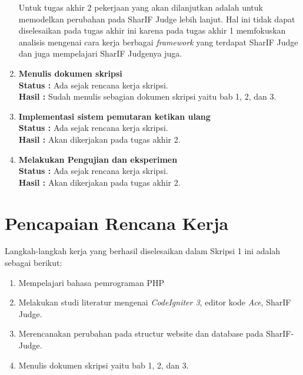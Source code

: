 \documentclass[a4paper,twoside]{article}
\begin{document}
\begin{enumerate}
	      \vspace{0.15cm}
	      Untuk tugas akhir 2 pekerjaan yang akan dilanjutkan adalah untuk memodelkan perubahan pada SharIF Judge lebih lanjut. Hal ini tidak dapat diselesaikan pada tugas akhir ini karena pada tugas akhir 1 memfokuskan analisis mengenai cara kerja berbagai \textit{framework} yang terdapat SharIF Judge dan juga mempelajari SharIF Judgenya juga.

	      \vspace{0.5cm}
	\item \textbf{Menulis dokumen skripsi}\\
	      {\bf Status :} Ada sejak rencana kerja skripsi.\\
	      {\bf Hasil :} Sudah menulis sebagian dokumen skripsi yaitu bab 1, 2, dan 3.

	      \vspace{0.5cm}
	\item \textbf{Implementasi sistem pemutaran ketikan ulang}\\
	      {\bf Status :} Ada sejak rencana kerja skripsi.\\
	      {\bf Hasil :} Akan dikerjakan pada tugas akhir 2.

	      \vspace{0.5cm}
	\item \textbf{Melakukan Pengujian dan eksperimen}\\
	      {\bf Status :} Ada sejak rencana kerja skripsi.\\
	      {\bf Hasil :} Akan dikerjakan pada tugas akhir 2.


\end{enumerate}

\newpage

\section{Pencapaian Rencana Kerja}
Langkah-langkah kerja yang berhasil diselesaikan dalam Skripsi 1 ini adalah sebagai berikut:
\begin{enumerate}
	\item Mempelajari bahasa pemrograman PHP
	\item Melakukan studi literatur mengenai \textit{CodeIgniter 3}, editor kode \textit{Ace}, SharIF Judge.
	\item Merencanakan perubahan pada structur website dan database pada SharIF-Judge.
	\item Menulis dokumen skripsi yaitu bab 1, 2, dan 3.
\end{enumerate}
\end{document}
